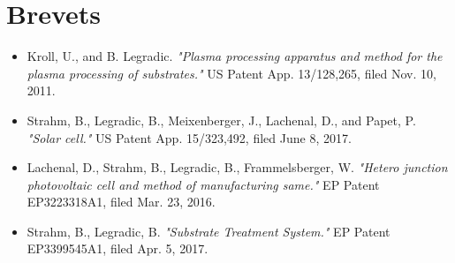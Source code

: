 \documentclass[verylight]{simplehipstercv}
\begin{document}
\section*{Brevets}
\begin{itemize}
    \item Kroll, U., and B. Legradic. \textit{"Plasma processing apparatus and method for the plasma processing of substrates."} US Patent App. 13/128,265, filed Nov. 10, 2011.
    \item Strahm, B., Legradic, B., Meixenberger, J., Lachenal, D., and Papet, P. \textit{"Solar cell."} US Patent App. 15/323,492, filed June 8, 2017.
    \item Lachenal, D., Strahm, B., Legradic, B., Frammelsberger, W. \textit{"Hetero junction photovoltaic cell and method of manufacturing same."} EP Patent EP3223318A1, filed Mar. 23, 2016.
    \item Strahm, B., Legradic, B. \textit{"Substrate Treatment System."} EP Patent EP3399545A1, filed Apr. 5, 2017.
\end{itemize}
\end{document}
